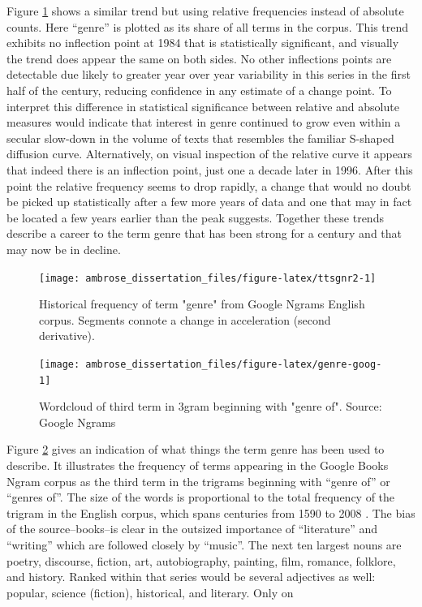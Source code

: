 \documentclass[]{book}
\theoremstyle{definition}
\theoremstyle{definition}
\theoremstyle{definition}
\theoremstyle{remark}
\begin{document}
Figure \ref{fig:ttsgnr2} shows a similar trend but using relative
frequencies instead of absolute counts. Here ``genre'' is plotted as its
share of all terms in the corpus. This trend exhibits no inflection
point at 1984 that is statistically significant, and visually the trend
does appear the same on both sides. No other inflections points are
detectable due likely to greater year over year variability in this
series in the first half of the century, reducing confidence in any
estimate of a change point. To interpret this difference in statistical
significance between relative and absolute measures would indicate that
interest in genre continued to grow even within a secular slow-down in
the volume of texts that resembles the familiar S-shaped diffusion
curve. Alternatively, on visual inspection of the relative curve it
appears that indeed there is an inflection point, just one a decade
later in 1996. After this point the relative frequency seems to drop
rapidly, a change that would no doubt be picked up statistically after a
few more years of data and one that may in fact be located a few years
earlier than the peak suggests. Together these trends describe a career
to the term genre that has been strong for a century and that may now be
in decline.

\begin{figure}

{\centering \texttt{[image: ambrose\_dissertation\_files/figure-latex/ttsgnr2-1]} 

}

\caption{Historical frequency of term "genre" from Google Ngrams English corpus. Segments connote a change in acceleration (second derivative).}\label{fig:ttsgnr2}
\end{figure}

\begin{figure}

{\centering \texttt{[image: ambrose\_dissertation\_files/figure-latex/genre-goog-1]} 

}

\caption{Wordcloud of third term in 3gram beginning with "genre of". Source: Google Ngrams}\label{fig:genre-goog}
\end{figure}

Figure \ref{fig:genre-goog} gives an indication of what things the term
genre has been used to describe. It illustrates the frequency of terms
appearing in the Google Books Ngram corpus as the third term in the
trigrams beginning with ``genre of'' or ``genres of''. The size of the
words is proportional to the total frequency of the trigram in the
English corpus, which spans centuries from 1590 to 2008 \citep{Google}.
The bias of the source--books--is clear in the outsized importance of
``literature'' and ``writing'' which are followed closely by ``music''.
The next ten largest nouns are poetry, discourse, fiction, art,
autobiography, painting, film, romance, folklore, and history. Ranked
within that series would be several adjectives as well: popular, science
(fiction), historical, and literary. Only on
\end{document}
